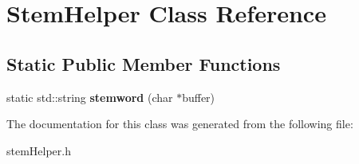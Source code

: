\hypertarget{class_stem_helper}{\section{Stem\+Helper Class Reference}
\label{class_stem_helper}
}
\subsection*{Static Public Member Functions}
\begin{DoxyCompactItemize}
\item 
\hypertarget{class_stem_helper_af2878d595387afb436bb38ae0a1c9f4d}{static std\+::string {\bfseries stemword} (char $\ast$buffer)}\label{class_stem_helper_af2878d595387afb436bb38ae0a1c9f4d}

\end{DoxyCompactItemize}


The documentation for this class was generated from the following file\+:\begin{DoxyCompactItemize}
\item 
stem\+Helper.\+h\end{DoxyCompactItemize}
